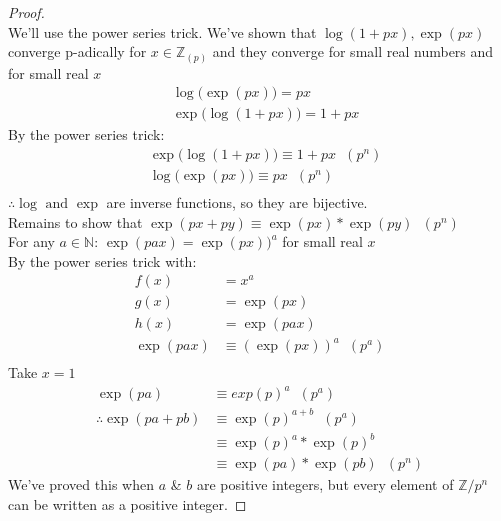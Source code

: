 \documentclass[11pt]{article}
\begin{document}
\begin{proof} $ $ \\[1em]
	We'll use the power series trick. We've shown that $\log(1+px), \exp(px)$ converge p-adically for $x \in \mathbb{Z}_{(p)}$ and they converge for small real numbers and for small real $x$
	\begin{align*}
		&\log\big(\exp(px)\big) = px\\[0.5em]
		&\exp\big(\log(1+px)\big) = 1+px
	\end{align*}
	By the power series trick:
	\begin{align*}
		&\exp\big(\log(1+px)\big) \equiv 1+px \hspace{7pt} (p^n)\\[0.5em]
		&\log\big(\exp(px)\big) \equiv px \hspace{7pt} (p^n) \\
	\end{align*}
	$\therefore \log \text{ and } \exp$ are inverse functions, so they are bijective.\\[0.5em]
	Remains to show that $\exp(px+py) \equiv \exp(px) * \exp(py) \hspace{7pt} (p^n)$\\[0.5em]

	For any $a \in \mathbb{N} $: $\exp(pax) = \exp(px))^a$ for small real $x$\\[1em]

	By the power series trick with:
	\begin{align*}
		f(x) &= x^a\\
		g(x) &= \exp(px)\\
		h(x) &= \exp(pax)\\[1em]
		\exp(pax) &\equiv (\exp(px))^a \hspace{7pt} (p^a)\\ 
	\end{align*}
	Take $x=1$
	\begin{align*}
		\exp(pa) &\equiv exp(p)^a \hspace{7pt} (p^a)  \\[0.5em]
		\therefore \exp(pa+pb) &\equiv \exp(p)^{a+b} \hspace{7pt} (p^a) \\[0.5em]
		&\equiv \exp(p)^a * \exp(p)^b \\
		&\equiv \exp(pa) * \exp(pb) \hspace{7pt} (p^n)
	\end{align*}
	We've proved this when $a$ \& $b$ are positive integers, but every element of $\mathbb{Z}/p^n$ can be written as a positive integer.
\end{proof}
\end{document}
